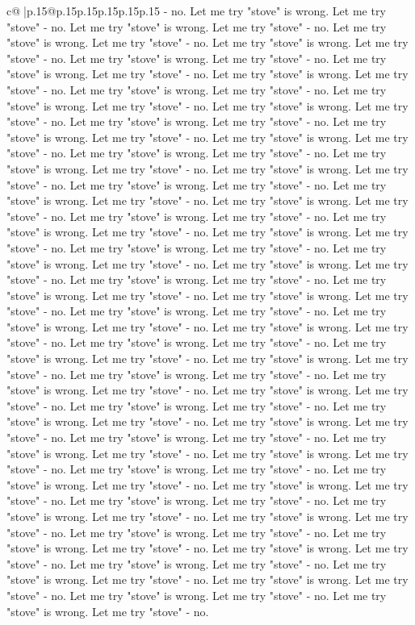 \documentclass{article}
\begin{document}
{\begin{supertabular}{c@{$\;$}|p{.15\linewidth}@{}p{.15\linewidth}p{.15\linewidth}p{.15\linewidth}p{.15\linewidth}p{.15\linewidth}}
{{{{-} no. Let me try "stove" is wrong. Let me try "stove" {-} no. Let me try "stove" is wrong. Let me try "stove" {-} no. Let me try "stove" is wrong. Let me try "stove" {-} no. Let me try "stove" is wrong. Let me try "stove" {-} no. Let me try "stove" is wrong. Let me try "stove" {-} no. Let me try "stove" is wrong. Let me try "stove" {-} no. Let me try "stove" is wrong. Let me try "stove" {-} no. Let me try "stove" is wrong. Let me try "stove" {-} no. Let me try "stove" is wrong. Let me try "stove" {-} no. Let me try "stove" is wrong. Let me try "stove" {-} no. Let me try "stove" is wrong. Let me try "stove" {-} no. Let me try "stove" is wrong. Let me try "stove" {-} no. Let me try "stove" is wrong. Let me try "stove" {-} no. Let me try "stove" is wrong. Let me try "stove" {-} no. Let me try "stove" is wrong. Let me try "stove" {-} no. Let me try "stove" is wrong. Let me try "stove" {-} no. Let me try "stove" is wrong. Let me try "stove" {-} no. Let me try "stove" is wrong. Let me try "stove" {-} no. Let me try "stove" is wrong. Let me try "stove" {-} no. Let me try "stove" is wrong. Let me try "stove" {-} no. Let me try "stove" is wrong. Let me try "stove" {-} no. Let me try "stove" is wrong. Let me try "stove" {-} no. Let me try "stove" is wrong. Let me try "stove" {-} no. Let me try "stove" is wrong. Let me try "stove" {-} no. Let me try "stove" is wrong. Let me try "stove" {-} no. Let me try "stove" is wrong. Let me try "stove" {-} no. Let me try "stove" is wrong. Let me try "stove" {-} no. Let me try "stove" is wrong. Let me try "stove" {-} no. Let me try "stove" is wrong. Let me try "stove" {-} no. Let me try "stove" is wrong. Let me try "stove" {-} no. Let me try "stove" is wrong. Let me try "stove" {-} no. Let me try "stove" is wrong. Let me try "stove" {-} no. Let me try "stove" is wrong. Let me try "stove" {-} no. Let me try "stove" is wrong. Let me try "stove" {-} no. Let me try "stove" is wrong. Let me try "stove" {-} no. Let me try "stove" is wrong. Let me try "stove" {-} no. Let me try "stove" is wrong. Let me try "stove" {-} no. Let me try "stove" is wrong. Let me try "stove" {-} no. Let me try "stove" is wrong. Let me try "stove" {-} no. Let me try "stove" is wrong. Let me try "stove" {-} no. Let me try "stove" is wrong. Let me try "stove" {-} no. Let me try "stove" is wrong. Let me try "stove" {-} no. Let me try "stove" is wrong. Let me try "stove" {-} no. Let me try "stove" is wrong. Let me try "stove" {-} no. Let me try "stove" is wrong. Let me try "stove" {-} no. Let me try "stove" is wrong. Let me try "stove" {-} no. Let me try "stove" is wrong. Let me try "stove" {-} no. Let me try "stove" is wrong. Let me try "stove" {-} no. Let me try "stove" is wrong. Let me try "stove" {-} no. Let me try "stove" is wrong. Let me try "stove" {-} no. Let me try "stove" is wrong. Let me try "stove" {-} no. Let me try "stove" is wrong. Let me try "stove" {-} no. Let me try "stove" is wrong. Let me try "stove" {-} no. Let me try "stove" is wrong. Let me try "stove" {-} no. Let me try "stove" is wrong. Let me try "stove" {-} no. Let me try "stove" is wrong. Let me try "stove" {-} no. Let me try "stove" is wrong. Let me try "stove" {-} no. }}}
\end{supertabular}}
\end{document}
